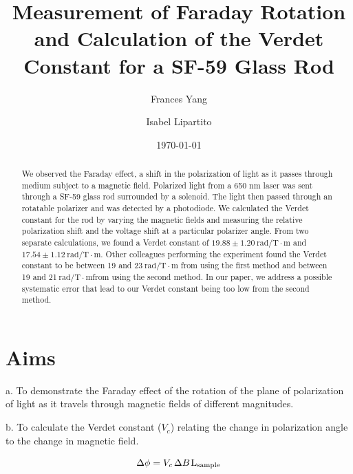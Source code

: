 \documentclass[prb,preprint]{revtex4-1}
\begin{document}
\title{Measurement of Faraday Rotation and Calculation of the Verdet Constant for a SF-59 Glass Rod}

\author{Frances Yang}

\author{Isabel Lipartito}

\date{\today}

\begin{abstract}
{We observed the Faraday effect, a shift in the polarization of light as it passes through medium subject to a magnetic field. Polarized light from a 650 nm laser was sent through a SF-59 glass rod surrounded by a solenoid. The light then passed through an rotatable polarizer and was detected by a photodiode. We calculated the Verdet constant for the rod by varying the magnetic fields and measuring the relative polarization shift and the voltage shift at a particular polarizer angle. From two separate calculations, we found a Verdet constant of $19.88 \pm 1.20 \mathrm{~rad/T} \cdot \textrm{m}$ and $17.54 \pm 1.12 \mathrm{~rad/T} \cdot \textrm{m}$. Other colleagues performing the experiment found the Verdet constant to be between 19 and 23$\mathrm{~rad/T} \cdot \textrm{m}$ from using the first method and between 19 and 21$\mathrm{~rad/T} \cdot \textrm{m} $from using the second method.  In our paper, we address a possible systematic error that lead to our Verdet constant being too low from the second method.

}
\end{abstract}

\maketitle 
\section{Aims}
{a.  To demonstrate the Faraday effect of the rotation of the plane of polarization of light as it travels through magnetic fields of different magnitudes.

b.  To calculate the Verdet constant ($V_{c}$) relating the change in polarization angle to the change in magnetic field.}
\begin{equation}
\label{vconst}
\Delta \phi =V_{c}\hspace{1.5pt} \Delta B\hspace{1pt}\textrm{L}{_{\textrm{sample}}}
\end{equation}
\end{document}
